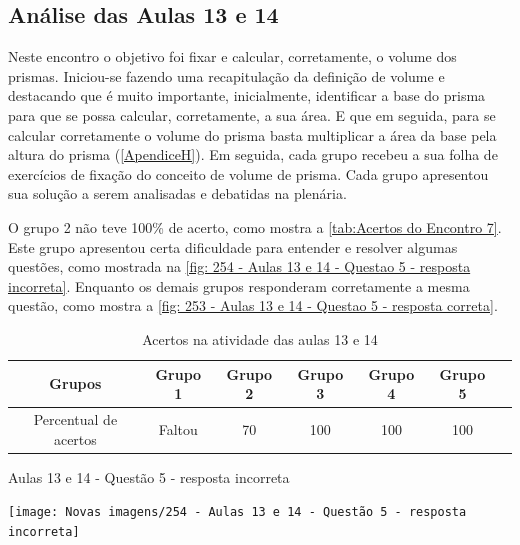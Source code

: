 \subsection{Análise das Aulas 13 e 14}

Neste encontro o objetivo foi fixar e calcular, corretamente, o volume dos prismas. Iniciou-se fazendo uma recapitulação da definição de volume e destacando que é muito importante, inicialmente, identificar a base do prisma para que se possa calcular, corretamente, a sua área. E que em seguida, para se calcular corretamente o volume do prisma basta multiplicar a área da base pela altura do prisma (\autoref{ApendiceH}). Em seguida, cada grupo recebeu a sua folha de exercícios de fixação do conceito de volume de prisma. Cada grupo apresentou sua solução a serem analisadas e debatidas na plenária.


O grupo 2 não teve 100\% de acerto, como mostra a \autoref{tab:Acertos do Encontro 7}. Este grupo apresentou certa dificuldade para entender e resolver algumas questões, como mostrada na \autoref{fig: 254 - Aulas 13 e 14 - Questao 5 - resposta incorreta}. Enquanto os demais grupos responderam corretamente a mesma questão, como mostra a \autoref{fig: 253 - Aulas 13 e 14 - Questao 5 - resposta correta}.

\begin{table}[htbp] \centering
    \caption{Acertos na atividade das aulas 13 e 14} \label{tab:Acertos do Encontro 7}
    \begin{tabular}{|c|c|c|c|c|c|c|}
        \hline
        \textbf{Grupos}       & \textbf{Grupo 1} & \textbf{Grupo 2} & \textbf{Grupo 3} & \textbf{Grupo 4} & \textbf{Grupo 5} \\
        \hline
        Percentual de acertos & Faltou           & 70               & 100              & 100              & 100              \\
        \hline
    \end{tabular}
    \legend{\legendaTabela}
\end{table}

\begin{CenteredFigure}
    \caption{Aulas 13 e 14 - Questão 5 - resposta incorreta} \label{fig: 254 - Aulas 13 e 14 - Questao 5 - resposta incorreta}
    \texttt{[image: Novas imagens/254 - Aulas 13 e 14 - Questão 5 - resposta incorreta]}
    \legend{\autoria}
\end{CenteredFigure}

